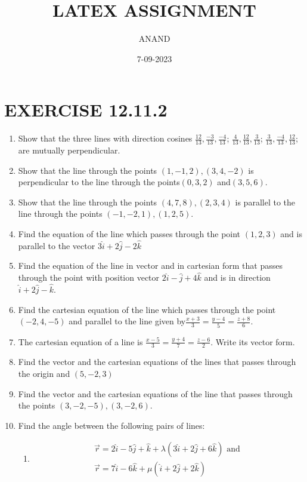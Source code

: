 \documentclass{article}                                                                              \usepackage{cite}
\theoremstyle{remark}
\begin{document}
\title{LATEX ASSIGNMENT}
\author{ANAND}
\date{7-09-2023}
\maketitle
\section*{EXERCISE 12.11.2}
\begin{enumerate}
\item  Show that the three lines with direction cosines
$\frac{12}{13}, \frac{-3}{13}, \frac{-4}{13}$; $\frac{4}{13}, \frac{12}{13}, \frac{3}{13}$; $\frac{3}{13}, \frac{-4}{13}, \frac{12}{13}$; are mutually perpendicular.
\item  Show that the line through the points $(1,-1,2),(3,4,-2 )$ is perpendicular to the line through the points$(0,3,2)$ and$(3,5,6)$.
\item Show that the line through the points $(4,7,8),(2,3,4)$ is parallel to the line through the points $(-1,-2,1),(1,2,5)$.
\item  Find the equation of the line which passes through the point $(1,2,3)$ and is parallel to the vector $3\hat{i}+2\hat{j}-2\hat{k}$
\item  Find the equation of the line in vector and in cartesian form that passes through the point with position vector $2\hat{i}-\hat{j}+4\hat{k}$ and is in direction $\hat{i}+2\hat{j}-\hat{k}$.
\item Find the cartesian equation of the line which passes through the point $(-2,4,-5)$ and parallel to the line given by$ \frac{x+3}{3}=\frac{y-4}{5}=\frac{z+8}{6}$.
\item The cartesian equation of a line is $ \frac{x-5}{3}=\frac{y+4}{7}=\frac{z-6}{2}$. Write its vector form.
\item Find the vector and the cartesian equations of the lines that passes through the origin and $(5,-2,3)$
\item Find the vector and the cartesian equations of the line that passes through the points $(3,-2,-5),(3,-2,6)$.
\item  Find the angle between the following pairs of lines:
\begin{enumerate}[label=(\roman*)]	
\item  
\begin{align}
\overrightarrow{r}=2\hat{i}-5\hat{j}+\hat{k}+\lambda(3\hat{i}+2\hat{j}+6\hat{k}) \text{ and }\\ \overrightarrow{r}=7\hat{i}-6\hat{k}+\mu(\hat{i}+2\hat{j}+2\hat{k}) 

\end{align}
\end{enumerate}
\end{enumerate}
\end{document}
